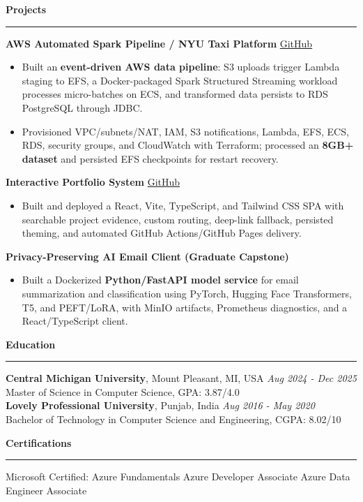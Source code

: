 \documentclass[11pt,letterpaper]{article}
\newcommand{\ressection}[1]{\Needspace{6\baselineskip}\vspace{8pt}\par\textbf{#1}\par\vspace{2pt}\hrule\vspace{5pt}}
\begin{document}
\ressection{Projects}
\textbf{AWS Automated Spark Pipeline / NYU Taxi Platform} \hfill \href{https://github.com/preferablehuman/AWS-automated-spark-pipeline}{GitHub}
\begin{itemize}
  \item Built an \textbf{event-driven AWS data pipeline}: S3 uploads trigger Lambda staging to EFS, a Docker-packaged Spark Structured Streaming workload processes micro-batches on ECS, and transformed data persists to RDS PostgreSQL through JDBC.
  \item Provisioned VPC/subnets/NAT, IAM, S3 notifications, Lambda, EFS, ECS, RDS, security groups, and CloudWatch with Terraform; processed an \textbf{8GB+ dataset} and persisted EFS checkpoints for restart recovery.
\end{itemize}
\vspace{2pt}
\textbf{Interactive Portfolio System} \hfill \href{https://github.com/preferablehuman/portfolio}{GitHub}
\begin{itemize}
  \item Built and deployed a React, Vite, TypeScript, and Tailwind CSS SPA with searchable project evidence, custom routing, deep-link fallback, persisted theming, and automated GitHub Actions/GitHub Pages delivery.
\end{itemize}
\vspace{2pt}
\textbf{Privacy-Preserving AI Email Client (Graduate Capstone)}
\begin{itemize}
  \item Built a Dockerized \textbf{Python/FastAPI model service} for email summarization and classification using PyTorch, Hugging Face Transformers, T5, and PEFT/LoRA, with MinIO artifacts, Prometheus diagnostics, and a React/TypeScript client.
\end{itemize}

\ressection{Education}
\textbf{Central Michigan University}, Mount Pleasant, MI, USA \hfill \textit{Aug 2024 - Dec 2025}\\
Master of Science in Computer Science, GPA: 3.87/4.0\\
\textbf{Lovely Professional University}, Punjab, India \hfill \textit{Aug 2016 - May 2020}\\
Bachelor of Technology in Computer Science and Engineering, CGPA: 8.02/10

\ressection{Certifications}
Microsoft Certified: Azure Fundamentals \textbar{} Azure Developer Associate \textbar{} Azure Data Engineer Associate
\end{document}
